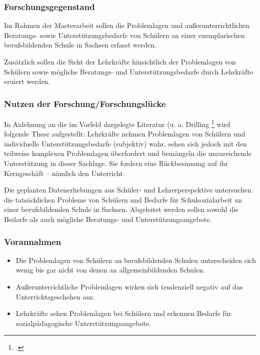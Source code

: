 \subsubsection{Forschungsgegenstand}
\label{sec:Forschungsgegenstand}

Im Rahmen der Masterarbeit sollen die Problemlagen und außerunterrichtlichen Be\-rat\-ungs- sowie Unterstützungsbedarfe von Schülern an einer exemplarischen berufsbildenden Schule in Sachsen erfasst werden.

Zusätzlich sollen die Sicht der Lehrkräfte hinsichtlich der Problemlagen von Schülern sowie mögliche Beratungs- und Unterstützungsbedarfe durch Lehrkräfte eruiert werden.

\subsubsection{Nutzen der Forschung/Forschungslücke}
\label{sec:NutzenDerForschungForschungslücke}

In Anlehnung an die im Vorfeld dargelegte Literatur (u. a. Drilling \footcite[vgl.][10]{Drilling2004} wird folgende These aufgestellt: Lehrkräfte nehmen Problemlagen von Schülern und individuelle Unterstützungsbedarfe (subjektiv) wahr, sehen sich jedoch mit den teilweise komplexen Problemlagen überfordert und bemängeln die unzureichende Unterstützung in dieser Sachlage. Sie fordern eine Rückbesinnung auf ihr Kerngeschäft -- nämlich den Unterricht.

Die geplanten Datenerhebungen aus Schüler- und Lehrerperspektive untersuchen die tatsächlichen Probleme von Schülern und Bedarfe für Schulsozialarbeit an einer berufsbildenden Schule in Sachsen. Abgeleitet werden sollen sowohl die Bedarfe als auch mögliche Beratungs- und Unterstützungsangebote.

\subsubsection{Vorannahmen}
\label{sec:Vorannahmen}

\begin{itemize}
	\item Die Problemlagen von Schülern an berufsbildenden Schulen unterscheiden sich wenig bis gar nicht von denen an allgemeinbildenden Schulen.
	\item Außerunterrichtliche Problemlagen wirken sich tendenziell negativ auf das Unterrichtsgeschehen aus.
	\item Lehrkräfte sehen Problemlagen bei Schülern und erkennen Bedarfe für sozialpädagogische Unterstützungsangebote. 
\end{itemize}

